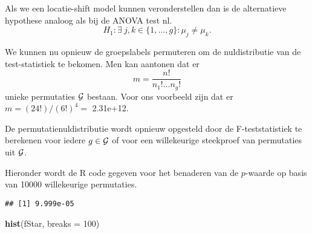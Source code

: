 \documentclass[12pt,dutch,coursenotes]{book}
\newenvironment{Shaded}{\begin{snugshade}}{\end{snugshade}}
\newcommand{\KeywordTok}[1]{\textcolor[rgb]{0.13,0.29,0.53}{\textbf{#1}}}
\newcommand{\DataTypeTok}[1]{\textcolor[rgb]{0.13,0.29,0.53}{#1}}
\newcommand{\DecValTok}[1]{\textcolor[rgb]{0.00,0.00,0.81}{#1}}
\newcommand{\StringTok}[1]{\textcolor[rgb]{0.31,0.60,0.02}{#1}}
\newcommand{\ControlFlowTok}[1]{\textcolor[rgb]{0.13,0.29,0.53}{\textbf{#1}}}
\newcommand{\OperatorTok}[1]{\textcolor[rgb]{0.81,0.36,0.00}{\textbf{#1}}}
\newcommand{\NormalTok}[1]{#1}
\theoremstyle{definition}
\theoremstyle{definition}
\theoremstyle{definition}
\theoremstyle{remark}
\begin{document}
Als we een locatie-shift model kunnen veronderstellen dan is de
alternatieve hypothese analoog als bij de ANOVA test nl.
\[H_1: \exists\ j,k \in \{1,\ldots,g\} : \mu_j\neq\mu_k.\]

We kunnen nu opnieuw de groepslabels permuteren om de nuldistributie van
de test-statistiek te bekomen. Men kan aantonen dat er
\[m=\frac{n!}{n_1!\ldots n_g!}\] unieke permutaties \(\cal{G}\) bestaan.
Voor ons voorbeeld zijn dat er \(m=(24!)/(6!)^4=\) 2.31e+12.

De permutatienuldistributie wordt opnieuw opgesteld door de
F-teststatistiek te berekenen voor iedere \(g\in \cal{G}\) of voor een
willekeurige steekproef van permutaties uit \(\cal{G}\).

Hieronder wordt de R code gegeven voor het benaderen van de \(p\)-waarde
op basis van 10000 willekeurige permutaties.

\begin{Shaded}
\end{Shaded}

\begin{verbatim}
## [1] 9.999e-05
\end{verbatim}

\begin{Shaded}
\begin{Highlighting}[]
\KeywordTok{hist}\NormalTok{(fStar, }\DataTypeTok{breaks =} \DecValTok{100}\NormalTok{)}
\end{Highlighting}
\end{Shaded}
\end{document}
